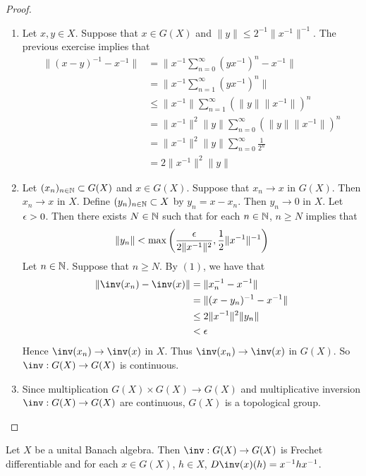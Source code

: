 \documentclass{book}
\begin{document}
\begin{proof}\
	\begin{enumerate}
		\item Let $x,y \in X$. Suppose that $x \in G(X)$ and $\|y\| \leq 2^{-1} \|x^{-1}\|^{-1}$. The previous exercise implies that 
		\begin{align*}
			\|(x - y)^{-1} - x^{-1}\|
			& = \bigg \| x^{-1}\sum_{n=0}^{\infty}(yx^{-1})^n  - x^{-1}\bigg\| \\
			& = \bigg \| x^{-1}\sum_{n=1}^{\infty}(yx^{-1})^n  \bigg\| \\
			& \leq \|x^{-1}\| \sum_{n=1}^{\infty} (\|y\|\|x^{-1}\|)^n \\
			& = \|x^{-1}\|^{2} \|y\| \sum_{n=0}^{\infty} (\|y\|\|x^{-1}\|)^n \\ 
			& = \|x^{-1}\|^{2} \|y\| \sum_{n=0}^{\infty} \frac{1}{2^n} \\
			& = 2 \|x^{-1}\|^{2} \|y\| 
		\end{align*}
		\item Let $(x_n)_{n \in \mathbb{N}} \subset G(X)$ and $x \in G(X)$. Suppose that $x_n \rightarrow x$ in $G(X)$. Then $x_n \rightarrow x$ in $X$. Define $(y_n)_{n \in \mathbb{N}} \subset X$ by $y_n = x - x_n$. Then $y_n \rightarrow 0$ in $X$. Let $\epsilon > 0$. Then there exists $N \in \mathbb{N}$ such that for each $n \in \mathbb{N}$, $n \geq N$ implies that 
		$$\|y_n \| < \max \bigg(\frac{\epsilon}{2\|x^{-1}\|^2}, \frac{1}{2} \|x^{-1}\|^{-1} \bigg)$$
		Let $n \in \mathbb{N}$. Suppose that $n \geq N$. By $(1)$, we have that 
		\begin{align*}
			\|\inv(x_n) - \inv(x)\|
			& = \|x_n^{-1} - x^{-1}\| \\
			& = \|(x - y_n)^{-1} - x^{-1}\| \\
			& \leq 2\|x^{-1}\|^2\|y_n\| \\
			& < \ep 
		\end{align*} 
		Hence $\inv(x_n) \rightarrow \inv(x)$ in $X$. Thus $\inv(x_n) \rightarrow \inv(x)$ in $G(X)$. So $\inv: G(X) \rightarrow G(X)$ is continuous. 
		\item Since multiplication $G(X) \times G(X) \rightarrow G(X)$ and multiplicative inversion $\inv: G(X) \rightarrow G(X)$ are continuous, $G(X)$ is a topological group. 
	\end{enumerate}
\end{proof}

\begin{ex}
	Let $X$ be a unital Banach algebra. Then $\inv: G(X) \rightarrow G(X)$ is Frechet differentiable and for each $x \in G(X)$, $h \in X$,  $D \inv(x)(h) = x^{-1}hx^{-1}$.
\end{ex}
\end{document}
